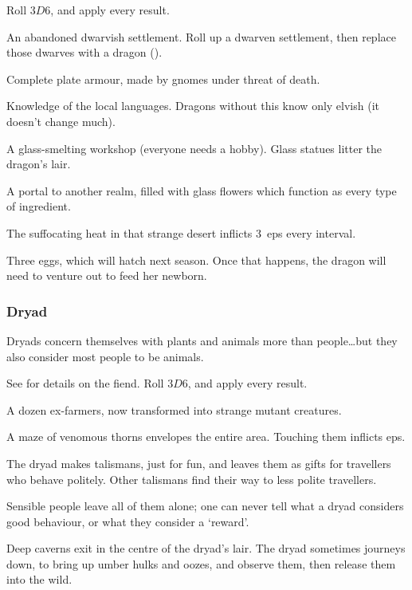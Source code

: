 \begin{multicols}{2}
Roll $3D6$, and apply every result.

\begin{dlist}
  \item
  An abandoned dwarvish settlement.
  Roll up a dwarven settlement, then replace those dwarves with a dragon ().
  \item
  Complete plate armour, made by gnomes under threat of death.
  \iftoggle{core}{(See the core rules, \autopageref{bandingArmour}.)}{}
  \item
  Knowledge of the local languages.
  Dragons without this know only elvish (it doesn't change much).
  \item
  A glass-smelting workshop (everyone needs a hobby).
  Glass statues litter the dragon's lair.
  \item
  A portal to another realm, filled with glass flowers which function as every type of \gls{ingredient}.

  The suffocating heat in that strange desert inflicts 3~\glspl{ep} every \gls{interval}.
  \item
  Three eggs, which will hatch next season.
  Once that happens, the dragon will need to venture out to feed her newborn.
\end{dlist}

\subsubsection{Dryad}
\label{dryadPoint}

Dryads concern themselves with plants and animals more than people\ldots but they also consider most people to be animals.

See  for details on the fiend.
Roll $3D6$, and apply every result.

\begin{dlist}
  \item
  A dozen ex-farmers, now transformed into strange mutant creatures.
  \item
  A maze of venomous thorns envelopes the entire area.
  Touching them inflicts \glspl{ep}.
  \item
  The dryad makes \glspl{talisman}, just for fun, and leaves them as gifts for travellers who behave politely.
  Other \glspl{talisman} find their way to less polite travellers.

  Sensible people leave all of them alone; one can never tell what a dryad considers good behaviour, or what they consider a `reward'.
  \item
  Deep caverns exit in the centre of the dryad's lair.
  The dryad sometimes journeys down, to bring up umber hulks and oozes, and observe them, then release them into the wild.


\end{dlist}
\end{multicols}
